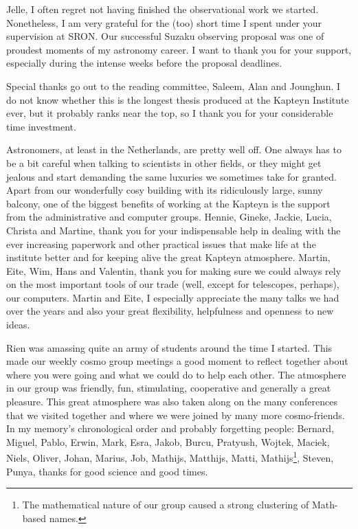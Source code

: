 Jelle, I often regret not having finished the observational work we started.
Nonetheless, I am very grateful for the (too) short time I spent under your supervision at SRON.\@
Our successful Suzaku observing proposal was one of proudest moments of my astronomy career.
I want to thank you for your support, especially during the intense weeks before the proposal deadlines.

Special thanks go out to the reading committee, Saleem, Alan and Jounghun.
I do not know whether this is the longest thesis produced at the Kapteyn Institute ever, but it probably ranks near the top, so I thank you for your considerable time investment.

Astronomers, at least in the Netherlands, are pretty well off.
One always has to be a bit careful when talking to scientists in other fields, or they might get jealous and start demanding the same luxuries we sometimes take for granted.
Apart from our wonderfully cosy building with its ridiculously large, sunny balcony, one of the biggest benefits of working at the Kapteyn is the support from the administrative and computer groups.
Hennie, Gineke, Jackie, Lucia, Christa and Martine, thank you for your indispensable help in dealing with the ever increasing paperwork and other practical issues that make life at the institute better and for keeping alive the great Kapteyn atmosphere.
Martin, Eite, Wim, Hans and Valentin, thank you for making sure we could always rely on the most important tools of our trade (well, except for telescopes, perhaps), our computers.
Martin and Eite, I especially appreciate the many talks we had over the years and also your great flexibility, helpfulness and openness to new ideas.

Rien was amassing quite an army of students around the time I started.
This made our weekly cosmo group meetings a good moment to reflect together about where you were going and what we could do to help each other.
The atmosphere in our group was friendly, fun, stimulating, cooperative and generally a great pleasure.
This great atmosphere was also taken along on the many conferences that we visited together and where we were joined by many more cosmo-friends.
In my memory's chronological order and probably forgetting people: Bernard, Miguel, Pablo, Erwin, Mark, Esra, Jakob, Burcu, Pratyush, Wojtek, Maciek, Niels, Oliver, Johan, Marius, Job, Mathijs, Matthijs, Matti, Mathijs\footnote{The mathematical nature of our group caused a strong clustering of Math-based names.}, Steven, Punya, thanks for good science and good times.

